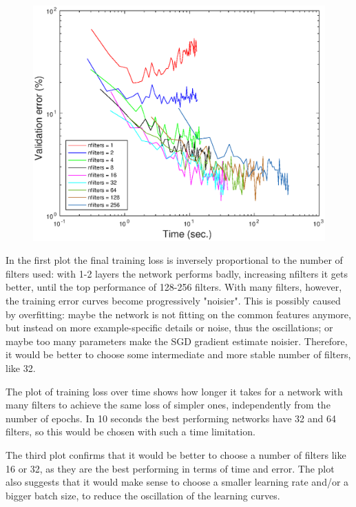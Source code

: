 \documentclass{article}
\begin{document}
    \begin{figure}[!htb]
        \centering
        \includegraphics[width=\textwidth]{figures/sc4_val_err_time}
    \end{figure}
    
    In the first plot the final training loss is inversely proportional to the number of filters used: with 1-2 layers the network performs badly,
    increasing nfilters it gets better, until the top performance of 128-256 filters. With many filters, however, the training error curves become
    progressively "noisier". This is possibly caused by overfitting: maybe the network is not fitting on the common features anymore, 
    but instead on more example-specific details or noise, thus the oscillations; or maybe too many parameters make the SGD gradient estimate noisier.
    Therefore, it would be better to choose some intermediate and more stable number of filters, like 32.
    
    The plot of training loss over time shows how longer it takes for a network with many filters to achieve the same loss of simpler ones, 
    independently from the number of epochs. 
    In 10 seconds the best performing networks have 32 and 64 filters, so this would be chosen with such a time limitation.
    
    The third plot confirms that it would be better to choose a number of filters like 16 or 32, as they are the best performing in terms of time and error.
    The plot also suggests that it would make sense to choose a smaller learning rate and/or a bigger batch size, to reduce the oscillation of the learning curves.
    
\end{document}
